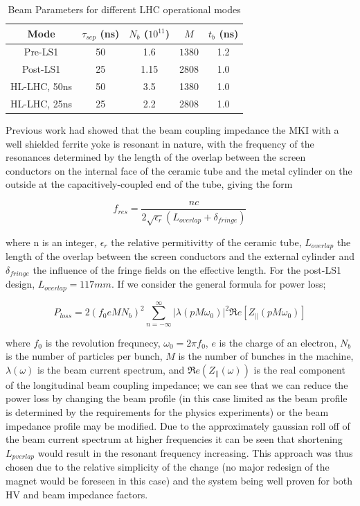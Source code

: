 \documentclass[a4paper,
              ]{jacow}
\begin{document}
\begin{table}
\caption{Beam Parameters for different LHC operational modes}
\label{tab:beamPara}
\begin{center}
\begin{tabular}{c | c | c | c | c}
Mode & $\tau_{sep}$ (ns) & $N_{b}$ ($10^{11}$) & $ M $ & $t_{b}$ (ns) \\ \hline 
Pre-LS1 & 50 & 1.6 & $ 1380 $ & 1.2 \\ \hline 
Post-LS1 & 25 & 1.15 & 2808 & 1.0 \\ \hline 
HL-LHC, 50ns & 50 & 3.5 & 1380 & 1.0 \\ \hline 
HL-LHC, 25ns & 25 & 2.2 & 2808 & 1.0 \\ 
\end{tabular}
\end{center}
\end{table}

Previous work had showed that the beam coupling impedance the MKI with a well shielded ferrite yoke is resonant in nature, with the frequency of the resonances determined by the length of the overlap between the screen conductors on the internal face of the ceramic tube and the metal cylinder on the outside at the capacitively-coupled end of the tube, giving the form

\begin{equation}
f_{res} = \frac{nc}{2\sqrt{\epsilon_{r}}\left( L_{overlap}+ \delta_{fringe} \right)}
\end{equation}

where n is an integer, $\epsilon_{r}$ the relative permitivitty of the ceramic tube, $L_{overlap}$ the length of the overlap between the screen conductors and the external cylinder and $\delta_{fringe}$ the influence of the fringe fields on the effective length. For the post-LS1 design, $L_{overlap} = 117mm$. If we consider the general formula for power loss;

\begin{equation}
P_{loss} = 2 \left( f_{0} e M  N_{b}\right)^{2} \displaystyle\sum\limits_{n = -\infty}^{\infty}  \left| \lambda \left( p M \omega_{0} \right)  \right|^{2} \Re{}e \left[ Z_{\parallel} \left( p M \omega_{0} \right) \right]
\label{eqn:powLoss}
\end{equation}

where $f_{0}$ is the revolution frequnecy, $\omega_{0} = 2\pi f_{0}$, $e$ is the charge of an electron, $N_{b}$ is the number of particles per bunch, $M$ is the number of bunches in the machine, $\lambda (\omega)$ is the beam current spectrum, and $\Re{}e(Z_{\parallel}(\omega))$ is the real component of the longitudinal beam coupling impedance; we can see that we can reduce the power loss by changing the beam profile (in this case limited as the beam profile is determined by the requirements for the physics experiments) or the beam impedance profile may be modified. Due to the approximately gaussian roll off of the beam current spectrum at higher frequencies it can be seen that shortening $L_{pverlap}$ would result in the resonant frequency increasing. This approach was thus chosen due to the relative simplicity of the change (no major redesign of the magnet would be foreseen in this case) and the system being well proven for both HV and beam impedance factors.
\end{document}
